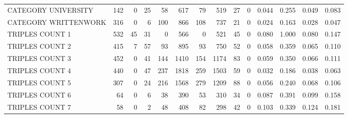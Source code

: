 \begin{tabular}{lrrrrrrrrrllll}
 CATEGORY UNIVERSITY      &             142 &             0 &              25 &              58 &             617 &   79 &  519 &   27 &    0 & 0.044 & 0.255 & 0.049 & 0.083 \\
 CATEGORY WRITTENWORK     &             316 &             0 &               6 &             100 &             866 &  108 &  737 &   21 &    0 & 0.024 & 0.163 & 0.028 & 0.047 \\
 TRIPLES COUNT 1          &             532 &            45 &              31 &               0 &             566 &    0 &  521 &   45 &    0 & 0.080 & 1.000 & 0.080 & 0.147 \\
 TRIPLES COUNT 2          &             415 &             7 &              57 &              93 &             895 &   93 &  750 &   52 &    0 & 0.058 & 0.359 & 0.065 & 0.110 \\
 TRIPLES COUNT 3          &             452 &             0 &              41 &             144 &            1410 &  154 & 1174 &   83 &    0 & 0.059 & 0.350 & 0.066 & 0.111 \\
 TRIPLES COUNT 4          &             440 &             0 &              47 &             237 &            1818 &  259 & 1503 &   59 &    0 & 0.032 & 0.186 & 0.038 & 0.063 \\
 TRIPLES COUNT 5          &             307 &             0 &              24 &             216 &            1568 &  279 & 1209 &   88 &    0 & 0.056 & 0.240 & 0.068 & 0.106 \\
 TRIPLES COUNT 6          &              64 &             0 &               6 &              38 &             390 &   53 &  310 &   34 &    0 & 0.087 & 0.391 & 0.099 & 0.158 \\
 TRIPLES COUNT 7          &              58 &             0 &               2 &              48 &             408 &   82 &  298 &   42 &    0 & 0.103 & 0.339 & 0.124 & 0.181 \\
\hline
\end{tabular}